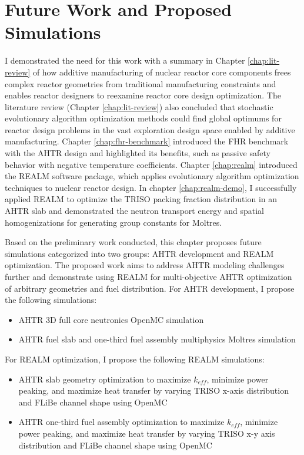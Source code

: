 \chapter{Future Work and Proposed Simulations}

I demonstrated the need for this work with a summary in Chapter \ref{chap:lit-review}
of how additive manufacturing of nuclear reactor core components frees complex 
reactor geometries from traditional manufacturing constraints and enables 
reactor designers to reexamine reactor core design optimization.
The literature review (Chapter \ref{chap:lit-review}) also concluded that 
stochastic evolutionary algorithm optimization methods could find global 
optimums for reactor design problems in the vast exploration design space 
enabled by additive manufacturing. 
Chapter \ref{chap:fhr-benchmark} introduced the \acrfull{FHR} benchmark with 
the \gls{AHTR} design and highlighted its benefits, such as passive safety 
behavior with negative temperature coefficients. 
Chapter \ref{chap:realm} introduced the \acrfull{REALM} software package, 
which applies evolutionary algorithm optimization techniques to nuclear 
reactor design. 
In chapter \ref{chap:realm-demo}, I successfully applied \gls{REALM} 
to optimize the \gls{TRISO} packing fraction distribution in an \gls{AHTR} slab
and demonstrated the neutron transport energy and spatial homogenizations for 
generating group constants for Moltres. 

Based on the preliminary work conducted, this chapter proposes 
future simulations categorized into two groups: \gls{AHTR} development and 
\gls{REALM} optimization. 
The proposed work aims to address \gls{AHTR} modeling challenges further and 
demonstrate using \gls{REALM} for multi-objective \gls{AHTR} 
optimization of arbitrary geometries and fuel distribution. 
For \gls{AHTR} development, I propose the following simulations: 
\begin{itemize}
    \item \gls{AHTR} 3D full core neutronics OpenMC simulation
    \item \gls{AHTR} fuel slab and one-third fuel assembly multiphysics 
    Moltres simulation
\end{itemize}
For \gls{REALM} optimization, I propose the following \gls{REALM} simulations: 
\begin{itemize}
    \item \gls{AHTR} slab geometry optimization to maximize $k_{eff}$, 
    minimize power peaking, and maximize heat transfer by varying \gls{TRISO} 
    x-axis distribution and \gls{FLiBe} channel shape using OpenMC
    \item \gls{AHTR} one-third fuel assembly optimization to maximize $k_{eff}$, 
    minimize power peaking, and maximize heat transfer by varying \gls{TRISO} 
    x-y axis distribution and \gls{FLiBe} channel shape using OpenMC
\end{itemize}

